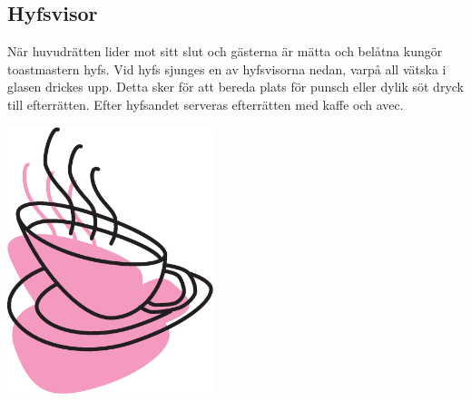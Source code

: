 \begin{flushleft}
\section{Hyfsvisor}
{\Large
När huvudrätten lider mot sitt slut och gästerna är mätta och belåtna
kungör toastmastern hyfs. Vid hyfs sjunges en av
hyfsvisorna nedan, varpå all vätska i glasen drickes upp. Detta sker för att bereda plats för punsch eller dylik söt dryck till
efterrätten. Efter hyfsandet serveras efterrätten med kaffe och avec.}
\end{flushleft}

\vspace{2cm}
\begin{center}
\includegraphics[width=6cm]{bilder/hyfs.eps}
\end{center}
\newpage

\newpage
{}